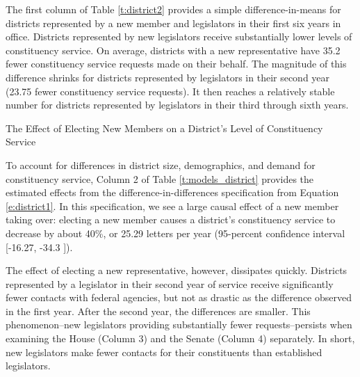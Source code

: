 \documentclass[12pt]{article}
\begin{document}
The first column of Table \ref{t:district2} provides a simple difference-in-means for districts represented by a new member and legislators in their first six years in office. Districts represented by new legislators receive substantially lower levels of constituency service. On average, districts with a new representative have 35.2 fewer constituency service requests made on their behalf. The magnitude of this difference shrinks for districts represented by legislators in their second year (23.75 fewer constituency service requests). It then reaches a relatively stable number for districts represented by legislators in their third through sixth years. %



\begin{table}[hbt!]
\caption{The Effect of Electing New Members on a District's Level of Constituency Service} \label{t:models_district}
\begin{minipage}{\textwidth}
\begin{center}

\end{center}
\end{minipage}
\end{table}


To account for differences in district size, demographics, and demand for constituency service, Column 2 of Table \ref{t:models_district} provides the estimated effects from the difference-in-differences specification from Equation \ref{e:district1}. In this specification, we see a large causal effect of a new member taking over: electing a new member causes a district’s constituency service to decrease by about 40\%, or 25.29 letters per year (95-percent confidence interval [-16.27, -34.3 ]).

The effect of electing a new representative, however, dissipates quickly. Districts represented by a legislator in their second year of service receive significantly fewer contacts with federal agencies, but not as drastic as the difference observed in the first year. After the second year, the differences are smaller. This phenomenon–new legislators providing substantially fewer requests–persists when examining the House (Column 3) and the Senate (Column 4) separately. In short, new legislators make fewer contacts for their constituents than established legislators.
\end{document}
